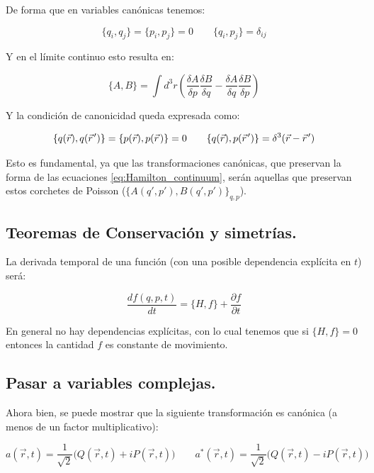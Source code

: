 De forma que en variables canónicas tenemos:

\begin{equation}
	\{q_i,q_j\}=\{p_i,p_j\}=0 \qquad \{q_i,p_j\} = \delta_{ij}
\end{equation}

Y en el límite continuo esto resulta en:

\begin{equation}
	\{A, B\} = \int d^3r \left(\frac{\delta A}{\delta p}\frac{\delta B}{\delta q} - \frac{\delta A}{\delta q}\frac{\delta B}{\delta p}\right)
\end{equation}

Y la condición de canonicidad queda expresada como:

\begin{equation}
	\{q(\vec r),q(\pvec r')\}=\{p(\vec r),p(\pvec r)\}=0 \qquad \{q(\vec r),p(\pvec r')\} = \delta^3(\vec r- \pvec r')
\end{equation}

Esto es fundamental, ya que las transformaciones canónicas, que preservan la forma de las ecuaciones \eqref{eq:Hamilton_continuum}, serán aquellas que preservan estos corchetes de Poisson ($\{A(q',p'), B(q',p')\}_{q,p}$).


\subsection*{Teoremas de Conservación y simetrías.}
La derivada temporal de una función (con una posible dependencia explícita en $t$) será:

\begin{equation}
	\frac{df(q,p,t)}{dt} = \{H, f\} + \frac{\partial f}{\partial t}
\end{equation}

En general no hay dependencias explícitas, con lo cual tenemos que si $\{H, f\}=0$ entonces la cantidad $f$ es constante de movimiento.



\subsection*{Pasar a variables complejas.}
Ahora bien, se puede mostrar que la siguiente transformación es canónica (a menos de un factor multiplicativo):

\begin{equation}
	a(\vec r,t)=\frac{1}{\sqrt{2}}\big(Q(\vec r,t)+iP(\vec r,t)\big) \qquad a^*(\vec r,t)=\frac{1}{\sqrt{2}}\big(Q(\vec r,t)-iP(\vec r,t)\big)
\end{equation}

